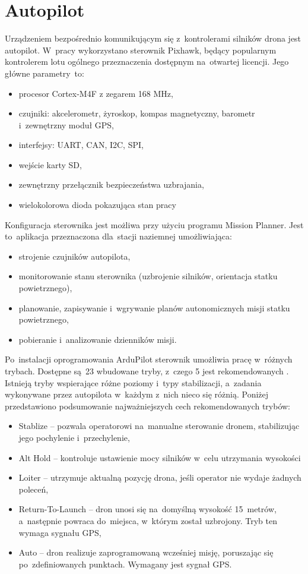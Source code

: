 \section{Autopilot}
\label{sec:autopilot}
Urządzeniem bezpośrednio komunikującym się z~kontrolerami silników drona jest autopilot. W~pracy wykorzystano sterownik Pixhawk, będący popularnym kontrolerem lotu ogólnego przeznaczenia dostępnym na~otwartej licencji.
Jego główne parametry~to:
\begin{itemize}
	\item procesor Cortex-M4F z zegarem 168 MHz,
	\item czujniki: akcelerometr, żyroskop, kompas magnetyczny, barometr i~zewnętrzny moduł GPS,
	\item interfejsy: UART, CAN, I2C, SPI,
	\item wejście karty SD,
	\item zewnętrzny przełącznik bezpieczeństwa uzbrajania,
	\item wielokolorowa dioda pokazująca stan pracy
\end{itemize}
Konfiguracja sterownika jest możliwa przy użyciu programu Mission Planner. Jest to~aplikacja przeznaczona dla~stacji naziemnej umożliwiająca:
\begin{itemize}
	\item strojenie czujników autopilota,
	\item monitorowanie stanu sterownika (uzbrojenie silników, orientacja statku powietrznego),
	\item planowanie, zapisywanie i~wgrywanie planów autonomicznych misji statku powietrznego,
	\item pobieranie i~analizowanie dzienników misji.
\end{itemize} 
Po~instalacji oprogramowania ArduPilot sterownik umożliwia pracę w~różnych trybach. Dostępne są~23 wbudowane tryby, z~czego 5 jest rekomendowanych \cite{pixhawk_modes}. Istnieją tryby wspierające różne poziomy i~typy stabilizacji, a~zadania wykonywane przez autopilota w~każdym z~nich nieco się różnią. Poniżej przedstawiono podsumowanie najważniejszych cech rekomendowanych trybów:
\begin{itemize}
	\item Stablize -- pozwala operatorowi na~manualne sterowanie dronem, stabilizując jego pochylenie i~przechylenie,
	\item Alt Hold -- kontroluje ustawienie mocy silników w~celu utrzymania wysokości
	\item Loiter --  utrzymuje aktualną pozycję drona, jeśli operator nie wydaje żadnych poleceń,
	\item Return-To-Launch --  dron unosi się na~domyślną wysokość 15~metrów, a~następnie powraca do~miejsca, w~którym został uzbrojony. Tryb ten wymaga sygnału GPS,
	\item Auto --  dron realizuje zaprogramowaną wcześniej misję, poruszając się po~zdefiniowanych punktach. Wymagany jest sygnał GPS.
\end{itemize}
